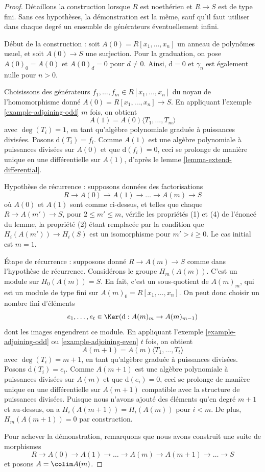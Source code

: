 \begin{proof}
Détaillons la construction lorsque $R$ est noethérien et $R\to S$ est de
type fini. Sans ces hypothèses, la démonstration est la même, sauf qu'il faut
utiliser dans chaque degré un ensemble de générateurs éventuellement infini.

\medskip\noindent
Début de la construction : soit $A(0) = R[x_1, \ldots, x_n]$ un anneau de
polynômes usuel, et soit $A(0) \to S$ une surjection. Pour la graduation, on
pose $A(0)_0 = A(0)$ et $A(0)_d = 0$ pour $d \not = 0$. Ainsi,
$\text{d} = 0$ et $\gamma_n$ est également nulle pour $n > 0$.

\medskip\noindent
Choisissons des générateurs $f_1, \ldots, f_m \in R[x_1, \ldots, x_n]$ du
noyau de l'homomorphisme donné
$A(0) = R[x_1, \ldots, x_n] \to S$. En appliquant l'exemple
\ref{example-adjoining-odd} $m$ fois, on obtient
$$
A(1) = A(0)\langle T_1, \ldots, T_m\rangle
$$
avec $\deg(T_i) = 1$, en tant qu'algèbre polynomiale graduée à puissances
divisées. Posons $\text{d}(T_i) = f_i$. Comme $A(1)$ est une algèbre
polynomiale à puissances divisées sur $A(0)$ et que
$\text{d}(f_i) = 0$, ceci se prolonge de manière unique en une différentielle
sur $A(1)$, d'après le lemme \ref{lemma-extend-differential}.

\medskip\noindent
Hypothèse de récurrence : supposons données des factorisations
$$
R \to A(0) \to A(1) \to \ldots \to A(m) \to S
$$
où $A(0)$ et $A(1)$ sont comme ci-dessus, et telles que chaque
$R \to A(m') \to S$, pour $2 \leq m' \leq m$, vérifie les propriétés (1)
et (4) de l'énoncé du lemme, la propriété (2) étant remplacée par la condition
que $H_i(A(m')) \to H_i(S)$ est un isomorphisme pour
$m' > i \geq 0$. Le cas initial est $m = 1$.

\medskip\noindent
Étape de récurrence : supposons donné $R \to A(m) \to S$ comme dans
l'hypothèse de récurrence. Considérons le groupe $H_m(A(m))$. C'est un module
sur $H_0(A(m)) = S$. En fait, c'est un sous-quotient de $A(m)_m$, qui est un
module de type fini sur $A(m)_0 = R[x_1, \ldots, x_n]$. On peut donc choisir
un nombre fini d'éléments
$$
e_1, \ldots, e_t \in \Ker(\text{d} : A(m)_m \to A(m)_{m - 1})
$$
dont les images engendrent ce module. En appliquant l'exemple
\ref{example-adjoining-odd} ou \ref{example-adjoining-even} $t$ fois, on
obtient
$$
A(m + 1) = A(m)\langle T_1, \ldots, T_t\rangle
$$
avec $\deg(T_i) = m + 1$, en tant qu'algèbre graduée à puissances divisées.
Posons $\text{d}(T_i) = e_i$. Comme $A(m+1)$ est une algèbre polynomiale à
puissances divisées sur $A(m)$ et que $\text{d}(e_i) = 0$, ceci se prolonge
de manière unique en une différentielle sur $A(m + 1)$ compatible avec la
structure de puissances divisées. Puisque nous n'avons ajouté des éléments
qu'en degré $m + 1$ et au-dessus, on a
$H_i(A(m + 1)) = H_i(A(m))$ pour $i < m$. De plus,
$H_m(A(m + 1)) = 0$ par construction.

\medskip\noindent
Pour achever la démonstration, remarquons que nous avons construit une suite
de morphismes
$$
R \to A(0) \to A(1) \to \ldots \to A(m) \to A(m + 1) \to \ldots \to S
$$
et posons $A = \colim A(m)$.
\end{proof}

